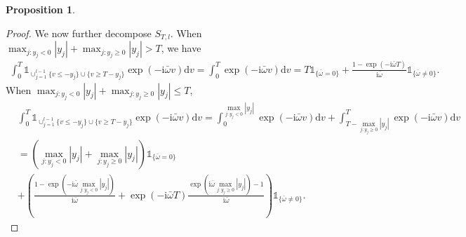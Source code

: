 \documentclass[11pt]{article}
\numberwithin{equation}{section}
\theoremstyle{plain}
\theoremstyle{definition}
\theoremstyle{definition}
\theoremstyle{assumption}
\theoremstyle{proposition}
\newtheorem{proposition}{Proposition}[section]
\theoremstyle{proposition}
\theoremstyle{example}
\theoremstyle{lemma}
\theoremstyle{theorem}
\theoremstyle{remark}
\begin{document}
\begin{proposition}
\begin{proof}
We now further decompose $S_{T,l}$. When $\max_{j:y_j<0}|y_j| + \max_{j:y_j\geqslant0}|y_j|> T$, we have 
\begin{align*}
\int_0^T \mathds{1}_{\cup_{j=1}^{l-1} \{v \leqslant -y_j\}\cup\{v \geqslant T - y_j\}}  \exp\left(-\mathrm{i}\bar{\omega}v \right)\mathrm{d}v
=\int_0^T \exp\left(-\mathrm{i}\bar{\omega}v \right)\mathrm{d}v
=T\mathds{1}_{\{\bar{\omega} = 0\}} + \frac{1 - \exp(-\mathrm{i}\bar{\omega}T)}{\mathrm{i}\bar{\omega}}\mathds{1}_{\{\bar{\omega} \neq 0\}} .
\end{align*}
When $\max_{j:y_j<0}|y_j| + \max_{j:y_j\geqslant0}|y_j|\leqslant T$,
\begin{align*}
&\int_0^T \mathds{1}_{\cup_{j=1}^{l-1} \{v \leqslant -y_j\}\cup\{v \geqslant T - y_j\}}  \exp\left(-\mathrm{i}\bar{\omega}v \right)\mathrm{d}v
=\int_0^{\max_{j:y_j<0}|y_j|} \exp\left(-\mathrm{i}\bar{\omega}v \right)\mathrm{d}v
+\int_{T - \max_{j:y_j\geqslant0}|y_j|}^{T} \exp\left(-\mathrm{i}\bar{\omega}v \right)\mathrm{d}v \\
&=\left(\max_{j:y_j<0}|y_j| + \max_{j:y_j\geqslant0}|y_j|\right)\mathds{1}_{\{\bar{\omega} = 0\}} \\
&+ \left(\frac{1 - \exp(-\mathrm{i}\bar{\omega}\max_{j:y_j<0}|y_j|)}{\mathrm{i}\bar{\omega}} +  \exp(-\mathrm{i}\bar{\omega}T)\frac{\exp(\mathrm{i}\bar{\omega}\max_{j:y_j\geqslant0}|y_j|) - 1 }{\mathrm{i}\bar{\omega}}\right)\mathds{1}_{\{\bar{\omega} \neq 0\}} .
\end{align*}

\end{proof}
\end{proposition}
\end{document}
